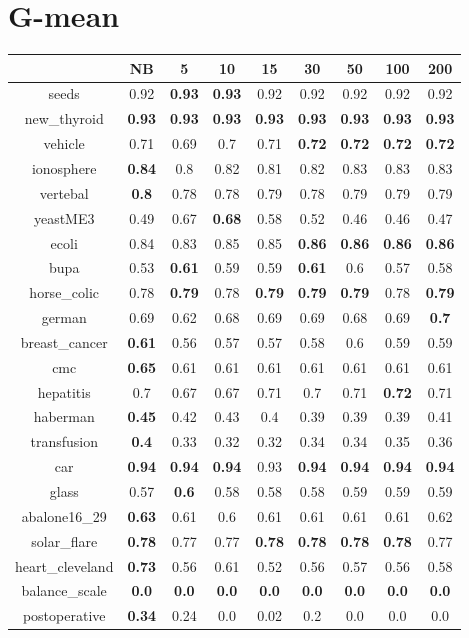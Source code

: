 \documentclass{article}%
\begin{document}
%
\section*{G{-}mean}%
\begin{tabular}{c|cccccccc}%
\hline%
&NB&5&10&15&30&50&100&200\\%
\hline%
seeds&0.92&\textbf{0.93}&\textbf{0.93}&0.92&0.92&0.92&0.92&0.92\\%
new\_thyroid&\textbf{0.93}&\textbf{0.93}&\textbf{0.93}&\textbf{0.93}&\textbf{0.93}&\textbf{0.93}&\textbf{0.93}&\textbf{0.93}\\%
vehicle&0.71&0.69&0.7&0.71&\textbf{0.72}&\textbf{0.72}&\textbf{0.72}&\textbf{0.72}\\%
ionosphere&\textbf{0.84}&0.8&0.82&0.81&0.82&0.83&0.83&0.83\\%
vertebal&\textbf{0.8}&0.78&0.78&0.79&0.78&0.79&0.79&0.79\\%
yeastME3&0.49&0.67&\textbf{0.68}&0.58&0.52&0.46&0.46&0.47\\%
ecoli&0.84&0.83&0.85&0.85&\textbf{0.86}&\textbf{0.86}&\textbf{0.86}&\textbf{0.86}\\%
bupa&0.53&\textbf{0.61}&0.59&0.59&\textbf{0.61}&0.6&0.57&0.58\\%
horse\_colic&0.78&\textbf{0.79}&0.78&\textbf{0.79}&\textbf{0.79}&\textbf{0.79}&0.78&\textbf{0.79}\\%
german&0.69&0.62&0.68&0.69&0.69&0.68&0.69&\textbf{0.7}\\%
breast\_cancer&\textbf{0.61}&0.56&0.57&0.57&0.58&0.6&0.59&0.59\\%
cmc&\textbf{0.65}&0.61&0.61&0.61&0.61&0.61&0.61&0.61\\%
hepatitis&0.7&0.67&0.67&0.71&0.7&0.71&\textbf{0.72}&0.71\\%
haberman&\textbf{0.45}&0.42&0.43&0.4&0.39&0.39&0.39&0.41\\%
transfusion&\textbf{0.4}&0.33&0.32&0.32&0.34&0.34&0.35&0.36\\%
car&\textbf{0.94}&\textbf{0.94}&\textbf{0.94}&0.93&\textbf{0.94}&\textbf{0.94}&\textbf{0.94}&\textbf{0.94}\\%
glass&0.57&\textbf{0.6}&0.58&0.58&0.58&0.59&0.59&0.59\\%
abalone16\_29&\textbf{0.63}&0.61&0.6&0.61&0.61&0.61&0.61&0.62\\%
solar\_flare&\textbf{0.78}&0.77&0.77&\textbf{0.78}&\textbf{0.78}&\textbf{0.78}&\textbf{0.78}&0.77\\%
heart\_cleveland&\textbf{0.73}&0.56&0.61&0.52&0.56&0.57&0.56&0.58\\%
balance\_scale&\textbf{0.0}&\textbf{0.0}&\textbf{0.0}&\textbf{0.0}&\textbf{0.0}&\textbf{0.0}&\textbf{0.0}&\textbf{0.0}\\%
postoperative&\textbf{0.34}&0.24&0.0&0.02&0.2&0.0&0.0&0.0\\%
\end{tabular}

%
\end{document}
